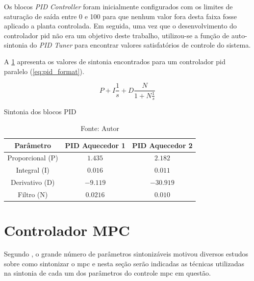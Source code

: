 Os blocos \textit{PID Controller} foram inicialmente configurados com os limites de saturação de saída
entre 0 e 100 para que nenhum valor fora desta faixa fosse aplicado a planta controlada.
Em seguida, uma vez que o desenvolvimento do controlador \acrshort{pid} não era um objetivo deste trabalho,
utilizou-se a função de auto-sintonia do \textit{PID Tuner} para encontrar valores satisfatórios de controle
do sistema.

A \cref{tab:pid_values} apresenta os valores de sintonia encontrados para um controlador \acrshort{pid}
paralelo (\cref{eq:pid_format}).

\begin{equation}
    \label{eq:pid_format}
    P + I \frac{1}{s} + D \frac{N}{1 + N \frac{1}{s}}
\end{equation}

\begin{table}[h]
	\centering
	\caption{Sintonia dos blocos PID}
	\label{tab:pid_values}
	\begin{tabular}{c|cc} \toprule
		{Parâmetro}		            & {PID Aquecedor 1}     & {PID Aquecedor 2}           \\ \midrule
		Proporcional (P)		    & $1.435$               & $2.182$                     \\
		Integral (I)   		        & $0.016$               & $0.011$                     \\
		Derivativo (D)		        & $-9.119$              & $-30.919$                   \\
		Filtro (N)                  & $0.0216$              & $0.010$                     \\ \bottomrule
	\end{tabular}
	\caption*{Fonte: Autor}
\end{table}


\section{Controlador MPC}
\label{sec:controlador_mpc}

Segundo , o grande número de parâmetros sintonizáveis motivou diversos estudos
sobre como sintonizar o \acrshort{mpc} e nesta seção serão indicadas as técnicas utilizadas na sintonia de cada
um dos parâmetros do controle \acrshort{mpc} em questão.


